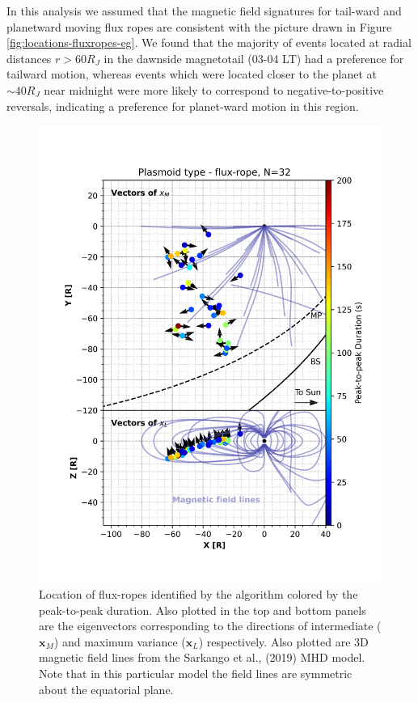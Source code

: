 In this analysis we assumed that the magnetic field signatures for tail-ward and planetward moving flux ropes are consistent with the picture drawn in Figure \ref{fig:locations-fluxropes-eg}. We found that the majority of events located at radial distances $r > 60 R_J$ in the dawnside magnetotail (03-04 LT) had a preference for tailward motion, whereas events which were located closer to the planet at $\sim40 R_J$ near midnight were more likely to correspond to negative-to-positive reversals, indicating a preference for planet-ward motion in this region. 

\begin{figure}
    \centering
    \includegraphics[height=0.8\textheight]{images6/TrajectoryLocationofEvent_quiver_flux-rope.png}
    \caption{Location of flux-ropes identified by the algorithm colored by the peak-to-peak duration. Also plotted in the top and bottom panels are the eigenvectors corresponding to the directions of intermediate ($\mathbf{x}_M$) and maximum variance ($\mathbf{x}_L$) respectively. Also plotted are 3D magnetic field lines from the Sarkango et al., (2019) MHD model. Note that in this particular model the field lines are symmetric about the equatorial plane.}
    \label{fig:trajectory-quiver-fluxropes}
\end{figure}

